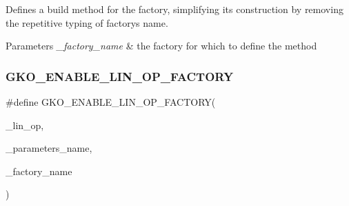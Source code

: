 Defines a build method for the factory, simplifying its construction by removing the repetitive typing of factory\textquotesingle{}s name. 


\begin{DoxyParams}{Parameters}
{\em \+\_\+factory\+\_\+name} & the factory for which to define the method \\
\hline
\end{DoxyParams}
\mbox{\label{group__LinOp_ga8e0af90ec2414b768266f77cedffc309}} 
\subsubsection{\texorpdfstring{G\+K\+O\+\_\+\+E\+N\+A\+B\+L\+E\+\_\+\+L\+I\+N\+\_\+\+O\+P\+\_\+\+F\+A\+C\+T\+O\+RY}{GKO\_ENABLE\_LIN\_OP\_FACTORY}}
{\footnotesize\ttfamily \#define G\+K\+O\+\_\+\+E\+N\+A\+B\+L\+E\+\_\+\+L\+I\+N\+\_\+\+O\+P\+\_\+\+F\+A\+C\+T\+O\+RY(\begin{DoxyParamCaption}\item[{}]{\+\_\+lin\+\_\+op,  }\item[{}]{\+\_\+parameters\+\_\+name,  }\item[{}]{\+\_\+factory\+\_\+name }\end{DoxyParamCaption})}

